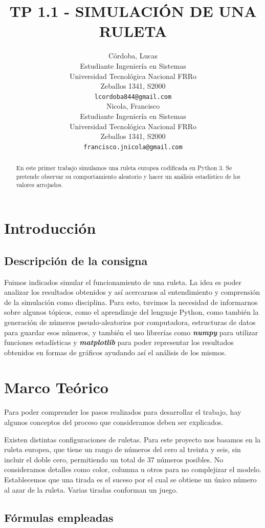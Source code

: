 \documentclass{article}
\title{TP 1.1 - SIMULACIÓN DE UNA RULETA}
\author{
 Córdoba, Lucas \\
  Estudiante Ingeniería en Sistemas\\
  Universidad Tecnológica Nacional FRRo\\
  Zeballos 1341, S2000 \\
  \texttt{lcordoba844@gmail.com} \\
   \And
 Nicola, Francisco \\
  Estudiante Ingeniería en Sistemas\\
  Universidad Tecnológica Nacional FRRo\\
  Zeballos 1341, S2000 \\
  \texttt{francisco.jnicola@gmail.com} \\
}
\begin{document}
\maketitle
\begin{abstract}
En este primer trabajo simulamos una ruleta europea codificada en Python 3. Se pretende observar su comportamiento aleatorio y hacer un análisis estadístico de los valores arrojados.
\end{abstract}

\section{Introducción}

\subsection{Descripción de la consigna}

Fuimos indicados simular el funcionamiento de una ruleta. La idea es poder analizar los resultados obtenidos y así acercarnos al entendimiento  y comprensión de la simulación como disciplina. Para esto, tuvimos la necesidad de informarnos sobre algunos tópicos, como el aprendizaje del lenguaje Python, como también la generación de números pseudo-aleatorios por computadora, estructuras de datos para guardar esos números, y también el uso librerías como \textbf{\textit{numpy}} para utilizar funciones estadísticas y \textbf{\textit{matplotlib}} para poder representar los resultados obtenidos en formas de gráficos ayudando así el análisis de los mismos.

\section{Marco Teórico}

Para poder comprender los pasos realizados para desarrollar el trabajo, hay algunos conceptos del proceso que consideramos deben ser explicados.

Existen distintas configuraciones de ruletas. Para este proyecto nos basamos en la ruleta europea, que tiene un rango de números del cero al treinta y seis, sin incluir el doble cero, permitiendo un total de 37 números posibles. No consideramos detalles como color, columna u otros para no complejizar el modelo. Establecemos que una tirada es el suceso por el cual se obtiene un único número al azar de la ruleta. Varias tiradas conforman un juego.

\subsection{Fórmulas empleadas}
\end{document}
